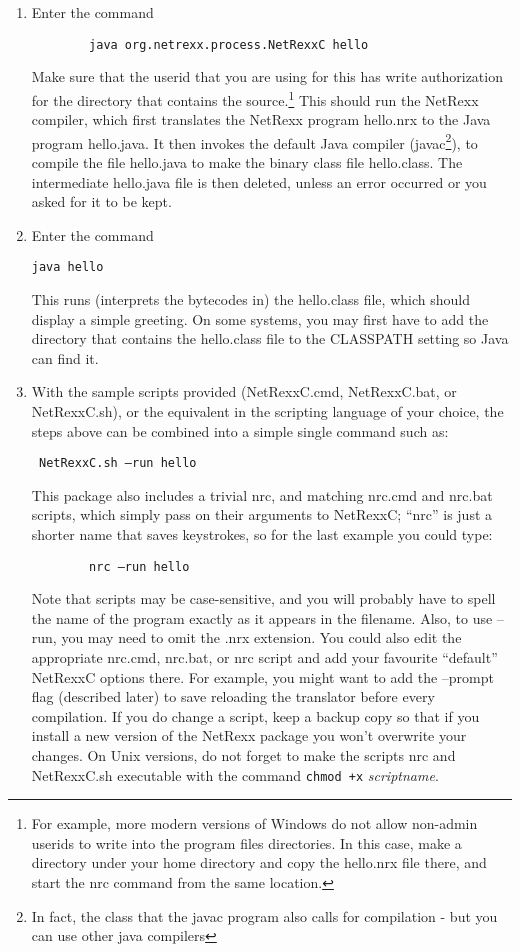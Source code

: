 \begin{enumerate}
\item Enter the command
 \begin{verbatim}
        java org.netrexx.process.NetRexxC hello
\end{verbatim}
Make sure that the userid that you are using for this has write
authorization for the directory that contains the source.\footnote{For example,
more modern versions of Windows do not allow non-admin userids to
write into the program files directories. In this case, make a
directory under your home directory and copy the hello.nrx file there,
and start the nrc command from the same location.}
This should run the NetRexx compiler, which first translates the
NetRexx program hello.nrx to the Java program hello.java. It then
invokes the default Java compiler (javac\footnote{In fact, the class
  that the javac program also calls for compilation - but you can use
  other java compilers}), to compile the file hello.java to make the binary class file hello.class. The intermediate hello.java file is then deleted, unless an error occurred or you asked for it to be kept.
\item Enter the command
 \begin{verbatim} 
java hello 
\end{verbatim}
This runs (interprets the bytecodes in) the hello.class file, which should display a simple greeting. On some systems, you may first have to add the directory that contains the hello.class file to the CLASSPATH setting so Java can find it. 
\item With the sample scripts provided (NetRexxC.cmd, NetRexxC.bat, or NetRexxC.sh), or the equivalent in the scripting language of your choice, the steps above can be combined into a simple single command such as:
  \begin{verbatim}
 NetRexxC.sh –run hello
\end{verbatim}
This package also includes a trivial nrc, and matching nrc.cmd and nrc.bat scripts, which simply pass on their arguments to NetRexxC; “nrc” is just a shorter name that saves keystrokes, so for the last example you could type: 
  \begin{verbatim}
        nrc –run hello
\end{verbatim}
Note that scripts may be case-sensitive, and you will probably have to spell the name of the program exactly as it appears in the filename. Also, to use –run, you may need to omit the .nrx extension. 
You could also edit the appropriate nrc.cmd, nrc.bat, or nrc script
and add your favourite “default” NetRexxC options there. For example,
you might want to add the –prompt flag (described later) to save
reloading the translator before every compilation. If you do change a
script, keep a backup copy so that if you install a new version of the
NetRexx package you won’t overwrite your changes. On Unix versions, do
not forget to make the scripts nrc and NetRexxC.sh executable with the
command \texttt{chmod +x} \emph{scriptname}.
\end{enumerate}
